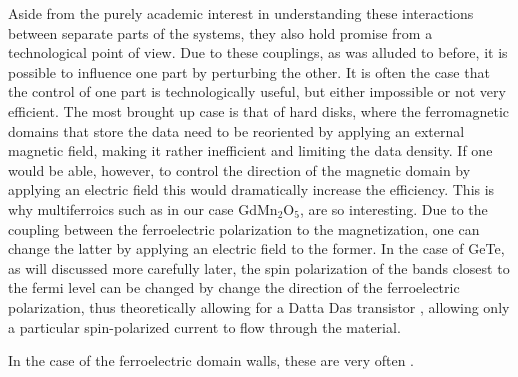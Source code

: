 Aside from the purely academic interest in understanding these interactions between separate parts of the systems, they also hold promise from a technological point of view. Due to these couplings, as was alluded to before, it is possible to influence one part by perturbing the other. It is often the case that the control of one part is technologically useful, but either impossible or not very efficient. The most brought up case is that of hard disks, where the ferromagnetic domains that store the data need to be reoriented by applying an external magnetic field, making it rather inefficient and limiting the data density. If one would be able, however, to control the direction of the magnetic domain by applying an electric field this would dramatically increase the efficiency. This is why multiferroics such as in our case GdMn$_2$O$_5$, are so interesting. Due to the coupling between the ferroelectric polarization to the magnetization, one can change the latter by applying an electric field to the former.
In the case of GeTe, as will discussed more carefully later, the spin polarization of the bands closest to the fermi level can be changed by change the direction of the ferroelectric polarization, thus theoretically allowing for a Datta Das transistor , allowing only a particular spin-polarized current to flow through the material.

In the case of the ferroelectric domain walls, these are very often .



